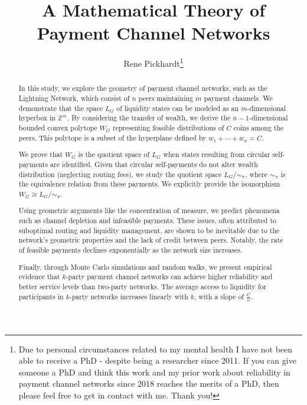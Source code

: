 \documentclass[10pt,twocolumn]{article}
\title{A Mathematical Theory of Payment Channel Networks}
\author{Rene Pickhardt\thanks{Due to personal circumstances related to my mental health I have not been able to receive a PhD - despite being a researcher since 2011. If you can give someone a PhD and think this work and my prior work about reliability in payment channel networks since 2018 reaches the merits of a PhD, then please feel free to get in contact with me. Thank you!}}
\begin{document}
 
\maketitle

 
\begin{abstract}

In this study, we explore the geometry of payment channel networks, such as the Lightning Network, which consist of \(n\) peers maintaining \(m\) payment channels. We demonstrate that the space \(L_G\) of liquidity states can be modeled as an \(m\)-dimensional hyperbox in \(\mathbb{Z}^m\). By considering the transfer of wealth, we derive the \(n-1\)-dimensional bounded convex polytope \(W_G\) representing feasible distributions of \(C\) coins among the peers. This polytope is a subset of the hyperplane defined by \(w_1 + \cdots + w_n = C\).

We prove that \(W_G\) is the quotient space of \(L_G\) when states resulting from circular self-payments are identified. Given that circular self-payments do not alter wealth distribution (neglecting routing fees), we study the quotient space \(L_G/\sim_\pi\), where \(\sim_\pi\) is the equivalence relation from these payments. We explicitly provide the isomorphism \(W_G \cong L_G/\sim_\pi\).

Using geometric arguments like the concentration of measure, we predict phenomena such as channel depletion and infeasible payments. These issues, often attributed to suboptimal routing and liquidity management, are shown to be inevitable due to the network’s geometric properties and the lack of credit between peers. Notably, the rate of feasible payments declines exponentially as the network size increases.

Finally, through Monte Carlo simulations and random walks, we present empirical evidence that \(k\)-party payment channel networks can achieve higher reliability and better service levels than two-party networks. The average access to liquidity for participants in \(k\)-party networks increases linearly with \(k\), with a slope of \(\frac{C}{n}\).
%


\end{abstract}
\end{document}

